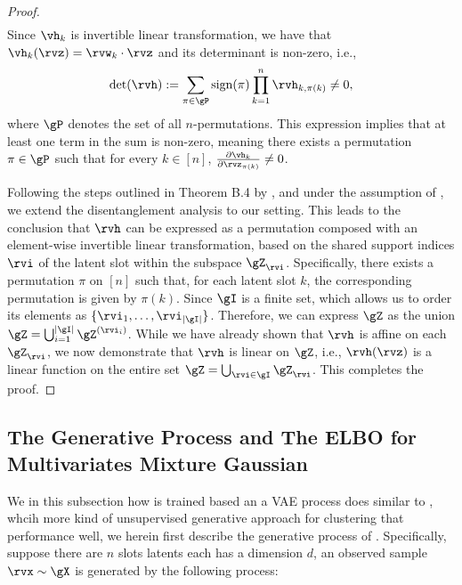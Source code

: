 \documentclass{article} %
\theoremstyle{plain}
\newcommand{\rebutall}[1]{\textcolor{red}{#1}}
\theoremstyle{definition}
\theoremstyle{remark}
\numberwithin{equation}{section}
\begin{document}
\begin{proof}
\begin{align}
\end{align}
Since $\vh_{k}$ is invertible linear transformation, we have that $\vh_{k}(\rvz)=\rvw_k\cdot\rvz$ and its determinant is non-zero, i.e.,
\begin{align}
\det(\rvh) := \sum_{\pi \in \gP} \text{sign}(\pi) \prod_{k=1}^{n} \rvh_{k, \pi(k)} \neq 0,
\end{align}
where \( \gP \) denotes the set of all \( n \)-permutations. This expression implies that at least one term in the sum is non-zero, meaning there exists a permutation \( \pi \in \gP \) such that for every \( k \in [n] \), \( \frac{\partial \vh_{k}}{\partial \rvz_{\pi(k)}} \neq 0 \).\par
Following the steps outlined in Theorem B.4 by \citep{lachapelle2022disentanglement}, and under the assumption of , we extend the disentanglement analysis to our setting. This leads to the conclusion that \( \rvh \) can be expressed as a permutation composed with an element-wise invertible linear transformation, based on the shared support indices \( \rvi \) of the latent slot within the subspace \( \gZ_{\rvi} \). Specifically, there exists a permutation \( \pi \) on \( [n] \) such that, for each latent slot \( k \), the corresponding permutation is given by \( \pi(k) \).
Since \( \gI \) is a finite set, which allows us to order its elements as \( \{\rvi_1, \dots, \rvi_{|\gI|}\} \). Therefore, we can express \( \gZ \) as the union \( \gZ = \bigcup_{i=1}^{|\gI|} \gZ^{(\rvi_i)} \). While we have already shown that \( \rvh \) is affine on each \( \gZ_{\rvi} \), we now demonstrate that \( \rvh \) is linear on \( \gZ \), i.e., \( \rvh(\rvz) \) is a linear function on the entire set \( \gZ = \bigcup_{\rvi \in \gI} \gZ_{\rvi} \). This completes the proof.
\end{proof}

\subsection{The Generative Process and The ELBO for Multivariates Mixture Gaussian}\label{sec:gen_process}
We in this subsection how \TimeCSL is trained based an a VAE process does similar to \citep{kivva2022identifiability, jang2016categorical}, whcih more kind of unsupervised generative approach for clustering that performance well, we herein first
describe the generative process of \TimeCSL. Specifically, suppose there are $n$ slots latents each has a dimension $d$,  an observed sample $\rvx \sim \gX$ is generated by the following process:
\end{document}
